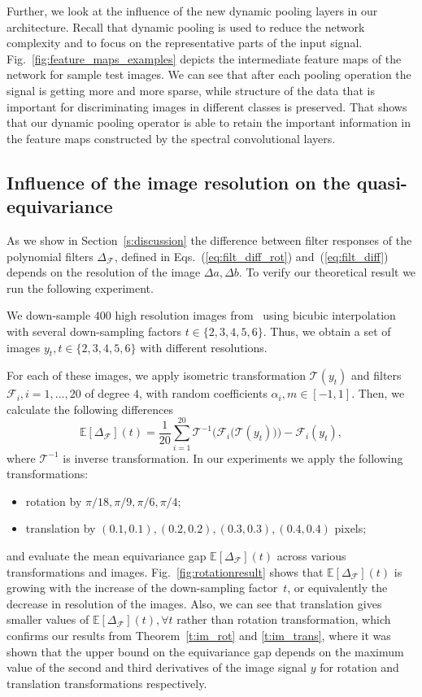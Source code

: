 \documentclass[10pt,journal,compsoc]{IEEEtran}
\newcommand{\mF}{\mathcal{F}}
\begin{document}
	
	Further, we look at the influence of the new dynamic pooling layers in our architecture. Recall that dynamic pooling is used to reduce the network complexity and to focus on the representative parts of the input signal. Fig.~\ref{fig:feature_maps_examples} depicts the intermediate feature maps of the network for sample test images. We can see that after each pooling operation the signal is getting more and more sparse, while structure of the data that is important for discriminating images in different classes is preserved. That shows that our dynamic pooling operator is able to retain the important information in the feature maps constructed by the spectral convolutional layers. 

	\subsection{Influence of the image resolution on the quasi-equivariance}
	
	As we show in Section~\ref{s:discussion} the difference between filter responses of the polynomial filters $\Delta_\mathcal{F}$, defined in Eqs.~(\ref{eq:filt_diff_rot}) and~(\ref{eq:filt_diff}) depends on the resolution of the image $\Delta a, \Delta b$. To verify our theoretical result we run the following experiment. 
	
	We down-sample $400$ high resolution images from~\cite{bb:Agustsson_2017_CVPR_Workshops} using bicubic interpolation with several down-sampling factors $t\in\{2,3,4,5,6\}$. Thus, we obtain a set of images $y_t, t\in\{2,3,4,5,6\}$ with different resolutions. 
	
	For each of these images,  we apply isometric transformation $\mathcal{T}(y_t)$ and filters $\mF_i, i =1,...,20$ of degree $4$, with random coefficients $\alpha_i,m \in [-1, 1]$. Then, we calculate the following differences 
		\begin{equation}
		\mathbb{E}[\Delta_{\mF}](t) = \frac{1}{20} \sum_{i=1}^{20} \mathcal{T}^{-1}\big(\mF_i\big(\mathcal{T}(y_t)\big)\big) - \mF_i(y_t),
		\label{eq:dist}
		\end{equation}
	where $\mathcal{T}^{-1}$ is inverse transformation. In our experiments we apply the following transformations: 
	\begin{itemize}
	\item rotation by $\pi/18, \pi/9, \pi/6, \pi/4$;
	\item translation by $(0.1, 0.1),(0.2, 0.2),(0.3, 0.3),(0.4, 0.4)$ pixels;
	\end{itemize}
	and evaluate the mean equivariance gap $\mathbb{E}[\Delta_{\mF}](t)$ across various transformations and images. Fig.~\ref{fig:rotationresult} shows that $\mathbb{E}[\Delta_{\mF}](t)$ is growing with the increase of the  down-sampling factor~$t$, or equivalently the decrease in resolution of the images.  Also, we can see that translation gives smaller values of  $\mathbb{E}[\Delta_{\mF}](t), \forall t$ rather than rotation transformation, which confirms our results from Theorem~\ref{t:im_rot} and \ref{t:im_trans}, where it was shown that the upper bound on the equivariance gap depends on the maximum value of the second and third derivatives of the image signal $y$ for rotation and translation transformations respectively.
	  
\end{document}

